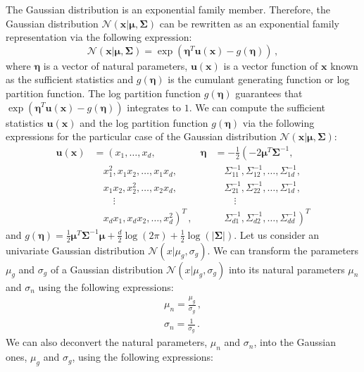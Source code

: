 The Gaussian distribution is an exponential family member. Therefore, the Gaussian distribution $\mathcal{N}(\mathbf{x}|\bm{\mu}, \bm{\Sigma})$ can be rewritten as an exponential family representation via the following expression:
\begin{equation}
\mathcal{N}(\mathbf{x}|\bm{\mu}, \bm{\Sigma}) = \exp (\bm{\eta}^T \mathbf{u}(\mathbf{x}) - g(\bm{\eta}))\,,
\end{equation}
where $\bm{\eta}$ is a vector of natural parameters, $\mathbf{u}(\mathbf{x})$ is a vector function of $\mathbf{x}$ known as the sufficient statistics and $g(\bm{\eta})$ is the cumulant generating function or log partition function. The log partition function $g(\bm{\eta})$ guarantees that $\exp (\bm{\eta}^T \mathbf{u}(\mathbf{x}) - g(\bm{\eta}))$ integrates to $1$. We can compute the sufficient statistics $\mathbf{u}(\mathbf{x})$ and the log partition function $g(\bm{\eta})$ via the following expressions for the particular case of the Gaussian distribution $\mathcal{N}(\mathbf{x}|\bm{\mu}, \bm{\Sigma})$:
\begin{align}
\mathbf{u}(\mathbf{x}) & = \left( x_1,\ldots,x_d, \right.  & \bm{\eta} & =  - \frac{1}{2} \left( -2 \bm{\mu}^T \bm{\Sigma}^{-1} \right.,  \nonumber \\
& \quad x_1^2, x_1 x_2, \ldots, x_1 x_d, && \quad \Sigma^{-1}_{11}, \Sigma^{-1}_{12}, \ldots, \Sigma^{-1}_{1d}, \nonumber \\ 
& \quad x_1 x_2, x_2^2, \ldots, x_2 x_d, && \quad \Sigma^{-1}_{21}, \Sigma^{-1}_{22}, \ldots, \Sigma^{-1}_{1d},\nonumber \\
& \quad \quad \vdots && \quad \quad \vdots \nonumber \\
& \quad \left. x_d x_1, x_d x_2, \ldots, x_d^2 \right)^T\,, && \quad \left. 
\Sigma^{-1}_{d1}, \Sigma^{-1}_{d2},\ldots, \Sigma^{-1}_{dd} \right)^T
\end{align}
and $g(\bm{\eta}) = \frac{1}{2} \bm{\mu}^T \bm{\Sigma}^{-1} \bm{\mu} + \frac{d}{2}\log(2\pi) + \frac{1}{2} \log(|\bm{\Sigma}|)$. Let us consider an univariate Gaussian distribution $\mathcal{N}(x|\mu_g, \sigma_g)$. We can transform the parameters $\mu_g$ and $\sigma_g$ of a Gaussian distribution $\mathcal{N}(x|\mu_g, \sigma_g)$ into its natural parameters $\mu_n$ and $\sigma_n$ using the following expressions:
\begin{align}
\mu_n = \frac{\mu_g}{\sigma_g} \,, \\
\sigma_n = \frac{1}{\sigma_g} \,.
\end{align}
We can also deconvert the natural parameters, $\mu_n$ and $\sigma_n$, into the Gaussian ones, $\mu_g$ and $\sigma_g$, using the following expressions:
